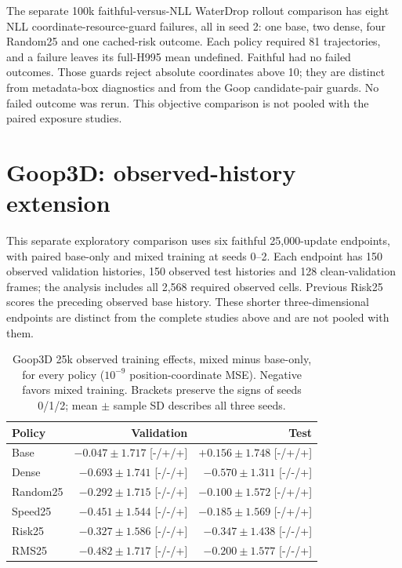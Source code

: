 The separate 100k faithful-versus-NLL WaterDrop rollout comparison has eight NLL coordinate-resource-guard failures, all in seed 2: one base, two dense, four Random25 and one cached-risk outcome. Each policy required 81 trajectories, and a failure leaves its full-H995 mean undefined. Faithful had no failed outcomes. Those guards reject absolute coordinates above 10; they are distinct from metadata-box diagnostics and from the Goop candidate-pair guards. No failed outcome was rerun. This objective comparison is not pooled with the paired exposure studies.

\section{Goop3D: observed-history extension}
\label{sec:goop3d-25k-exposure}
This separate exploratory comparison uses six faithful 25,000-update endpoints, with paired base-only and mixed training at seeds 0--2. Each endpoint has 150 observed validation histories, 150 observed test histories and 128 clean-validation frames; the analysis includes all 2,568 required observed cells. Previous Risk25 scores the preceding observed base history. These shorter three-dimensional endpoints are distinct from the complete studies above and are not pooled with them.

\begin{table}[!ht]
\centering\small
\setlength{\tabcolsep}{5pt}\renewcommand{\arraystretch}{1.12}
\caption{Goop3D 25k observed training effects, mixed minus base-only, for every policy ($10^{-9}$ position-coordinate MSE). Negative favors mixed training. Brackets preserve the signs of seeds 0/1/2; mean $\pm$ sample SD describes all three seeds.}
\label{tab:goop3d25k-observed-position-training}
\begin{tabular}{lrr}
\toprule
Policy & Validation & Test\\
\midrule
Base & $-0.047\pm1.717$ [-/+/+] & $+0.156\pm1.748$ [-/+/+]\\
Dense & $-0.693\pm1.741$ [-/-/+] & $-0.570\pm1.311$ [-/-/+]\\
Random25 & $-0.292\pm1.715$ [-/-/+] & $-0.100\pm1.572$ [-/+/+]\\
Speed25 & $-0.451\pm1.544$ [-/-/+] & $-0.185\pm1.569$ [-/+/+]\\
Risk25 & $-0.327\pm1.586$ [-/-/+] & $-0.347\pm1.438$ [-/-/+]\\
RMS25 & $-0.482\pm1.717$ [-/-/+] & $-0.200\pm1.577$ [-/-/+]\\
\bottomrule
\end{tabular}
\end{table}

